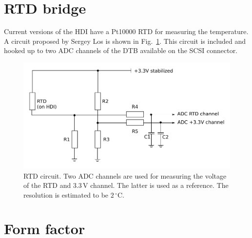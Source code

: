 \section{RTD bridge}
Current versions of the HDI have a Pt10000 RTD for measuring the temperature. A circuit proposed by Sergey Los is shown in Fig.~\ref{fig:RTDcircuit}. This circuit is included and hooked up to two ADC channels of the DTB available on the SCSI connector.

\begin{figure}[hbtp]
	\begin{center}
	\includegraphics[width=.7\textwidth]{img/RTDcircuit.pdf}
	\end{center}
	\caption{RTD circuit. Two ADC channels are used for measuring the voltage of the RTD and 3.3\,V channel. The latter is used as a reference. The resolution is estimated to be $2\,^\circ$C.}
	\label{fig:RTDcircuit}
\end{figure}


\section{Form factor}

